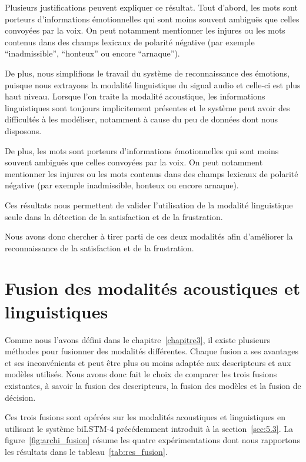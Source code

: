 
Plusieurs justifications peuvent expliquer ce résultat. Tout d'abord, les mots sont porteurs d'informations émotionnelles qui sont moins souvent ambiguës que celles convoyées par la voix. On peut notamment mentionner les injures ou les mots contenus dans des champs lexicaux de polarité négative (par exemple ``inadmissible'', ``honteux'' ou encore ``arnaque'').

De plus, nous simplifions le travail du système de reconnaissance des émotions, puisque nous extrayons la modalité linguistique du signal audio et celle-ci est plus haut niveau. Lorsque l'on traite la modalité acoustique, les informations linguistiques sont toujours implicitement présentes et le système peut avoir des difficultés à les modéliser, notamment à cause du peu de données dont nous disposons.

De plus, les mots sont porteurs d'informations émotionnelles qui sont moins souvent ambiguës que celles convoyées par la voix. On peut notamment mentionner les injures ou les mots contenus dans des champs lexicaux de polarité négative (par exemple inadmissible, honteux ou encore arnaque).

Ces résultats nous permettent de valider l'utilisation de la modalité linguistique seule dans la détection de la satisfaction et de la frustration.

Nous avons donc chercher à tirer parti de ces deux modalités afin d'améliorer la reconnaissance de la satisfaction et de la frustration.

\section{Fusion des modalités acoustiques et linguistiques}
Comme nous l'avons défini dans le chapitre~\ref{chapitre3}, il existe plusieurs méthodes pour fusionner des modalités différentes. Chaque fusion a ses avantages et ses inconvénients et peut être plus ou moins adaptée aux descripteurs et aux modèles utilisés. Nous avons donc fait le choix de comparer les trois fusions existantes, à savoir la fusion des descripteurs, la fusion des modèles et la fusion de décision.

Ces trois fusions sont opérées sur les modalités acoustiques et linguistiques en utilisant le système biLSTM-4 précédemment introduit à la section~\ref{sec:5.3}. La figure~\ref{fig:archi_fusion} résume les quatre expérimentations dont nous rapportons les résultats dans le tableau~\ref{tab:res_fusion}.

